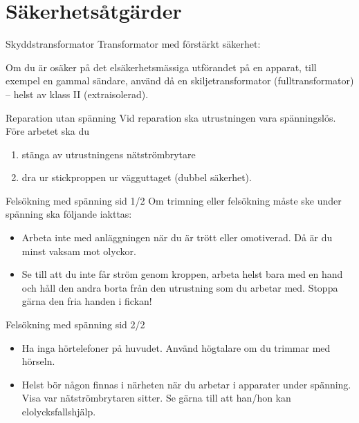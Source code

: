 \documentclass{beamer}
\begin{document}
\section{Säkerhetsåtgärder}
\begin{frame}{Skyddstransformator}
Transformator med förstärkt säkerhet:

\begin{center}
	\begin{minipage}{0.19\columnwidth}
		\Huge{\selectfont{}\relax}
	\end{minipage}
	\begin{minipage}{0.7\columnwidth}
		Om du är osäker på det elsäkerhetsmässiga utförandet på en
		apparat, till exempel en gammal sändare, använd då en skiljetransformator
		(fulltransformator) -- helst av klass II (extraisolerad).
	\end{minipage}
\end{center}
\end{frame}

\begin{frame}{Reparation utan spänning}
Vid reparation ska utrustningen vara spänningslös.
Före arbetet ska du

\begin{enumerate}
	\item stänga av utrustningens nätströmbrytare
	\item dra ur stickproppen ur vägguttaget (dubbel säkerhet).
\end{enumerate}
\end{frame}

\begin{frame}{Felsökning med spänning sid 1/2}
Om trimning eller felsökning måste ske under spänning ska följande iakttas:
\begin{itemize}
	\item Arbeta inte med anläggningen när du är trött eller omotiverad.
	Då är du minst vaksam mot olyckor.
	\item Se till att du inte får ström genom kroppen, arbeta helst bara med en
	hand och håll den andra borta från den utrustning som du arbetar med.
	Stoppa gärna den fria handen i fickan!
\end{itemize}
\end{frame}

\begin{frame}{Felsökning med spänning sid 2/2}
\begin{itemize}
	\item Ha inga hörtelefoner på huvudet.
	Använd högtalare om du trimmar med hörseln.
	\item Helst bör någon finnas i närheten när du arbetar i apparater under
	spänning.
	Visa var nätströmbrytaren sitter.
	Se gärna till att han/hon kan elolycksfallshjälp.
\end{itemize}
\end{frame}
\end{document}
